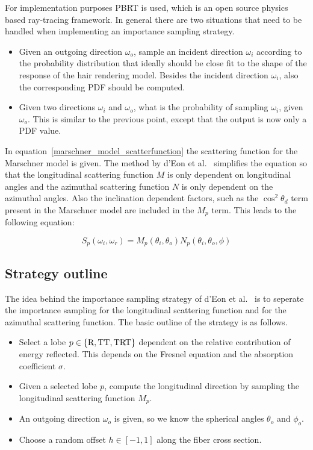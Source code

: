 \documentclass[11pt,a4paper]{report}
\begin{document}
For implementation purposes PBRT is used, which is an open source physics based ray-tracing framework. In general there are two situations that need to be handled when implementing an importance sampling strategy.

\begin{itemize}
    \item Given an outgoing direction $\omega_o$, sample an incident direction $\omega_i$ according to the probability distribution that ideally should be close fit to the shape of the response of the hair rendering model. Besides the incident direction $\omega_i$, also the corresponding PDF should be computed.
    \item Given two directions $\omega_i$ and $\omega_o$, what is the probability of sampling $\omega_i$, given $\omega_o$. This is similar to the previous point, except that the output is now only a PDF value.
\end{itemize}

In equation~\ref{marschner_model_scatterfunction} the scattering function for the Marschner model is given. The method by d'Eon et al.~\cite{eon2011} simplifies the equation so that the longitudinal scattering function $M$ is only dependent on longitudinal angles and the azimuthal scattering function $N$ is only dependent on the azimuthal angles. Also the inclination dependent factors, such as the $\cos^2 \theta_d$ term present in the Marschner model are included in the $M_p$ term. This leads to the following equation:

\begin{equation}
S_p(\omega_i, \omega_r) = M_p(\theta_i, \theta_o) N_p(\theta_i, \theta_o, \phi)
\end{equation}

\subsection{Strategy outline}

The idea behind the importance sampling strategy of d'Eon et al.~\cite{eon2013} is to seperate the importance sampling for the longitudinal scattering function and for the azimuthal scattering function. The basic outline of the strategy is as follows.

\begin{itemize}
\item Select a lobe $p \in \{ \textnormal{R}, \textnormal{TT}, \textnormal{TRT} \}$ dependent on the relative contribution of energy reflected. This depends on the Fresnel equation and the absorption coefficient $\sigma$.
\item Given a selected lobe $p$, compute the longitudinal direction by sampling the longitudinal scattering function $M_p$.
\item An outgoing direction $\omega_o$ is given, so we know the spherical angles $\theta_o$ and $\phi_o$.
\item Choose a random offset $h \in [-1, 1]$ along the fiber cross section.
\end{itemize}
\end{document}
